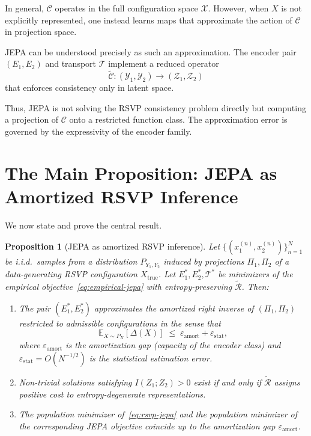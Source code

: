 \documentclass[12pt, oneside]{article}
\newtheorem{proposition}[definition]{Proposition}
\begin{document}
In general, $\mathcal{C}$ operates in the full configuration space $\mathcal{X}$. However, when $X$ is not explicitly represented, one instead learns maps that approximate the action of $\mathcal{C}$ in projection space.

JEPA can be understood precisely as such an approximation. The encoder pair $(E_1, E_2)$ and transport $\mathcal{T}$ implement a reduced operator
\[
\widetilde{\mathcal{C}} : (\mathcal{Y}_1, \mathcal{Y}_2) \to (\mathcal{Z}_1, \mathcal{Z}_2)
\]
that enforces consistency only in latent space.

Thus, JEPA is not solving the RSVP consistency problem directly but computing a projection of $\mathcal{C}$ onto a restricted function class. The approximation error is governed by the expressivity of the encoder family.

\section{The Main Proposition: JEPA as Amortized RSVP Inference}
\label{sec:amortized}

We now state and prove the central result.

\begin{proposition}[JEPA as amortized RSVP inference]
\label{prop:main}
Let $\{(x_1^{(n)}, x_2^{(n)})\}_{n=1}^N$ be i.i.d.\ samples from a distribution $P_{Y_1, Y_2}$ induced by projections $\Pi_1, \Pi_2$ of a data-generating RSVP configuration $X_{\mathrm{true}}$. Let $E_1^*, E_2^*, \mathcal{T}^*$ be minimizers of the empirical objective~\eqref{eq:empirical-jepa} with entropy-preserving $\widetilde{\mathcal{R}}$. Then:
\begin{enumerate}[label=(\roman*)]
\item The pair $(E_1^*, E_2^*)$ approximates the amortized right inverse of $(\Pi_1, \Pi_2)$ restricted to admissible configurations in the sense that
\[
\mathbb{E}_{X \sim P_X}\left[ \Delta(X) \right] \;\leq\; \varepsilon_{\mathrm{amort}} + \varepsilon_{\mathrm{stat}},
\]
where $\varepsilon_{\mathrm{amort}}$ is the amortization gap (capacity of the encoder class) and $\varepsilon_{\mathrm{stat}} = O(N^{-1/2})$ is the statistical estimation error.
\item Non-trivial solutions satisfying $I(Z_1; Z_2) > 0$ exist if and only if $\widetilde{\mathcal{R}}$ assigns positive cost to entropy-degenerate representations.
\item The population minimizer of~\eqref{eq:rsvp-jepa} and the population minimizer of the corresponding JEPA objective coincide up to the amortization gap $\varepsilon_{\mathrm{amort}}$.
\end{enumerate}
\end{proposition}
\end{document}
